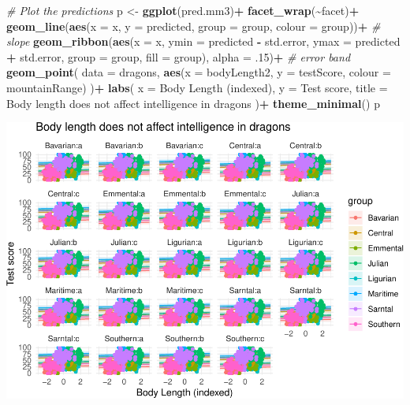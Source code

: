 \documentclass[
]{article}
\newenvironment{Shaded}{\begin{snugshade}}{\end{snugshade}}
\newcommand{\AttributeTok}[1]{\textcolor[rgb]{0.13,0.29,0.53}{#1}}
\newcommand{\CommentTok}[1]{\textcolor[rgb]{0.56,0.35,0.01}{\textit{#1}}}
\newcommand{\DecValTok}[1]{\textcolor[rgb]{0.00,0.00,0.81}{#1}}
\newcommand{\FunctionTok}[1]{\textcolor[rgb]{0.13,0.29,0.53}{\textbf{#1}}}
\newcommand{\NormalTok}[1]{#1}
\newcommand{\OtherTok}[1]{\textcolor[rgb]{0.56,0.35,0.01}{#1}}
\newcommand{\SpecialCharTok}[1]{\textcolor[rgb]{0.81,0.36,0.00}{\textbf{#1}}}
\newcommand{\StringTok}[1]{\textcolor[rgb]{0.31,0.60,0.02}{#1}}
\begin{document}
\begin{Shaded}
\begin{Highlighting}[]
\CommentTok{\# Plot the predictions}
\NormalTok{p }\OtherTok{\textless{}{-}} \FunctionTok{ggplot}\NormalTok{(pred.mm3)}\SpecialCharTok{+}
  \FunctionTok{facet\_wrap}\NormalTok{(}\SpecialCharTok{\textasciitilde{}}\NormalTok{facet)}\SpecialCharTok{+}
  \FunctionTok{geom\_line}\NormalTok{(}\FunctionTok{aes}\NormalTok{(}\AttributeTok{x =}\NormalTok{ x, }\AttributeTok{y =}\NormalTok{ predicted, }\AttributeTok{group =}\NormalTok{ group, }\AttributeTok{colour =}\NormalTok{ group))}\SpecialCharTok{+}   \CommentTok{\# slope}
  \FunctionTok{geom\_ribbon}\NormalTok{(}\FunctionTok{aes}\NormalTok{(}\AttributeTok{x =}\NormalTok{ x, }\AttributeTok{ymin =}\NormalTok{ predicted }\SpecialCharTok{{-}}\NormalTok{ std.error, }\AttributeTok{ymax =}\NormalTok{ predicted }\SpecialCharTok{+}\NormalTok{ std.error, }\AttributeTok{group =}\NormalTok{ group, }\AttributeTok{fill =}\NormalTok{ group), }\AttributeTok{alpha =}\NormalTok{ .}\DecValTok{15}\NormalTok{)}\SpecialCharTok{+}   \CommentTok{\# error band}
  \FunctionTok{geom\_point}\NormalTok{(}
    \AttributeTok{data =}\NormalTok{ dragons,}
    \FunctionTok{aes}\NormalTok{(}\AttributeTok{x =}\NormalTok{ bodyLength2, }\AttributeTok{y =}\NormalTok{ testScore, }\AttributeTok{colour =}\NormalTok{ mountainRange)}
\NormalTok{  )}\SpecialCharTok{+}
  \FunctionTok{labs}\NormalTok{(}
    \AttributeTok{x =} \StringTok{\textquotesingle{}Body Length (indexed)\textquotesingle{}}\NormalTok{, }\AttributeTok{y =} \StringTok{\textquotesingle{}Test score\textquotesingle{}}\NormalTok{,}
    \AttributeTok{title =} \StringTok{\textquotesingle{}Body length does not affect intelligence in dragons\textquotesingle{}}
\NormalTok{  )}\SpecialCharTok{+}
  \FunctionTok{theme\_minimal}\NormalTok{()}
\NormalTok{p}
\end{Highlighting}
\end{Shaded}

\includegraphics{Introduction-to-linear-mixed-models_files/figure-latex/unnamed-chunk-25-2.pdf}
\end{document}

